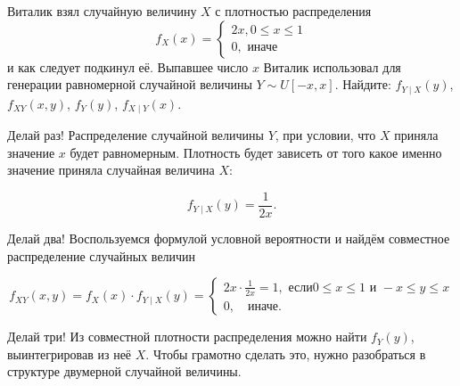 \begin{problem} 
Виталик взял случайную величину $X$  с плотностью распределения 
\[ 
f_X(x) = \begin{cases} 2x,  0 \le x \le 1 \\ 0, \text{ иначе} \end{cases}
\]	 
и как следует подкинул её. Выпавшее число  $x$ Виталик использовал для генерации равномерной случайной величины $Y \sim U[-x, x]$. Найдите: $f_{Y \mid X} (y)$,   $f_{XY}(x,y)$,  $f_Y(y)$,  $f_{X \mid Y} (x)$.

\begin{sol}
Делай раз! Распределение случайной величины $Y$, при условии, что $X$ приняла значение $x$ будет равномерным.  Плотность будет зависеть от того какое именно значение приняла случайная величина $X$: 

\[f_{Y \mid X}(y) = \frac{1}{2x}.\]
	
Делай два! Воспользуемся формулой условной вероятности и найдём совместное 	распределение случайных величин

\[f_{XY} (x,y) = f_X(x) \cdot f_{Y \mid X} (y) =  \begin{cases} 2x \cdot \frac{1}{2x} = 1, \text{ если} 0 \le x \le 1 \text{ и } -x \le y \le x  \\ 0, \quad \text{иначе}. \end{cases} \]
	
Делай  три! Из совместной плотности распределения можно найти $f_Y(y)$, выинтегрировав из неё $X$. Чтобы грамотно сделать это, нужно разобраться в структуре двумерной случайной величины. 

\begin{center}
\end{center} 


\end{sol}
\end{problem}
